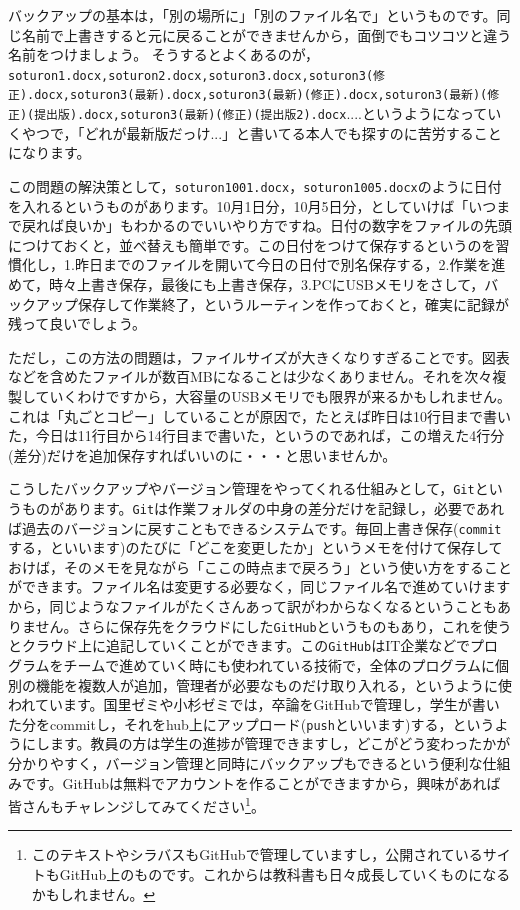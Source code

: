 \documentclass{ltjsbook}
\begin{document}
バックアップの基本は，「別の場所に」「別のファイル名で」というものです。同じ名前で上書きすると元に戻ることができませんから，面倒でもコツコツと違う名前をつけましょう。
そうするとよくあるのが，\verb|soturon1.docx,soturon2.docx,soturon3.docx,soturon3(修正).docx,soturon3(最新).docx,soturon3(最新)(修正).docx,soturon3(最新)(修正)(提出版).docx,soturon3(最新)(修正)(提出版2).docx|....というようになっていくやつで，「どれが最新版だっけ...」と書いてる本人でも探すのに苦労することになります。

この問題の解決策として，\verb|soturon1001.docx|，\verb|soturon1005.docx|のように日付を入れるというものがあります。10月1日分，10月5日分，としていけば「いつまで戻れば良いか」もわかるのでいいやり方ですね。日付の数字をファイルの先頭につけておくと，並べ替えも簡単です。この日付をつけて保存するというのを習慣化し，1.昨日までのファイルを開いて今日の日付で別名保存する，2.作業を進めて，時々上書き保存，最後にも上書き保存，3.PCにUSBメモリをさして，バックアップ保存して作業終了，というルーティンを作っておくと，確実に記録が残って良いでしょう。

ただし，この方法の問題は，ファイルサイズが大きくなりすぎることです。図表などを含めたファイルが数百MBになることは少なくありません。それを次々複製していくわけですから，大容量のUSBメモリでも限界が来るかもしれません。
これは「丸ごとコピー」していることが原因で，たとえば昨日は10行目まで書いた，今日は11行目から14行目まで書いた，というのであれば，この増えた4行分(差分)だけを追加保存すればいいのに・・・と思いませんか。

こうしたバックアップやバージョン管理をやってくれる仕組みとして，\verb|Git|というものがあります。\verb|Git|は作業フォルダの中身の差分だけを記録し，必要であれば過去のバージョンに戻すこともできるシステムです。毎回上書き保存(\verb|commit|する，といいます)のたびに「どこを変更したか」というメモを付けて保存しておけば，そのメモを見ながら「ここの時点まで戻ろう」という使い方をすることができます。ファイル名は変更する必要なく，同じファイル名で進めていけますから，同じようなファイルがたくさんあって訳がわからなくなるということもありません。さらに保存先をクラウドにした\verb|GitHub|というものもあり，これを使うとクラウド上に追記していくことができます。この\verb|GitHub|はIT企業などでプログラムをチームで進めていく時にも使われている技術で，全体のプログラムに個別の機能を複数人が追加，管理者が必要なものだけ取り入れる，というように使われています。国里ゼミや小杉ゼミでは，卒論をGitHubで管理し，学生が書いた分をcommitし，それをhub上にアップロード(\verb|push|といいます)する，というようにします。教員の方は学生の進捗が管理できますし，どこがどう変わったかが分かりやすく，バージョン管理と同時にバックアップもできるという便利な仕組みです。GitHubは無料でアカウントを作ることができますから，興味があれば皆さんもチャレンジしてみてください\footnote{このテキストやシラバスもGitHubで管理していますし，公開されているサイトもGitHub上のものです。これからは教科書も日々成長していくものになるかもしれません。}。
\end{document}
